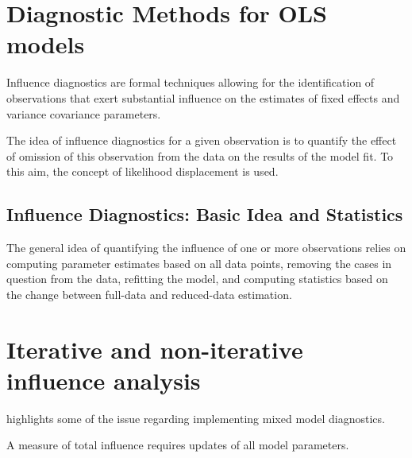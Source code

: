 \documentclass[12pt, a4paper]{article}
\begin{document}
	\newpage
	\section*{Diagnostic Methods for OLS models}
	Influence diagnostics are formal techniques allowing for the identification of observations that exert substantial 
	influence on the estimates of fixed effects and variance covariance parameters. 
	
	The idea of influence diagnostics for a given observation is to quantify the effect of omission of this observation 
	from the data on the results of the model fit. To this aim, the concept of likelihood displacement is used. 
	
	
	
	\subsection*{Influence Diagnostics: Basic Idea and Statistics} %
	
	The general idea of quantifying the influence of one or more observations relies on computing parameter estimates based on all data points, removing the cases in question from the data, refitting the model, and computing statistics based on the change between full-data and reduced-data estimation. 
	

\newpage
\section{Iterative and non-iterative influence analysis} %
\citet{schabenberger} highlights some of the issue regarding implementing mixed model diagnostics.


A measure of total influence requires updates of all model parameters.
\end{document}
